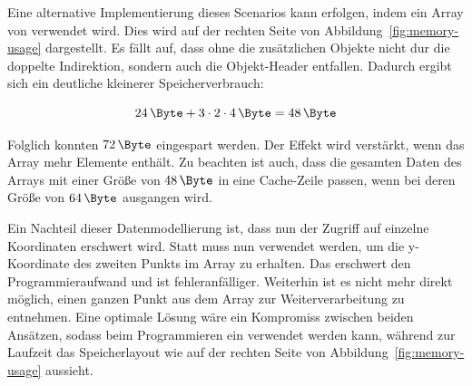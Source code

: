 Eine alternative Implementierung dieses Scenarios kann erfolgen, indem ein Array von  verwendet wird.
Dies wird auf der rechten Seite von Abbildung~\ref{fig:memory-usage} dargestellt.
Es fällt auf, dass ohne die zusätzlichen Objekte nicht dur die doppelte Indirektion, sondern auch die Objekt-Header entfallen.
Dadurch ergibt sich ein deutliche kleinerer Speicherverbrauch:

\begin{equation}
    \SI{24}{\Byte} + 3 \cdot 2 \cdot \SI{4}{\Byte} = \SI{48}{\Byte}\label{eq:memory-usage-flat}
\end{equation}

Folglich konnten $\SI{72}{\Byte}$ eingespart werden.
Der Effekt wird verstärkt, wenn das Array mehr Elemente enthält.
Zu beachten ist auch, dass die gesamten Daten des Arrays mit einer Größe von $\SI{48}{\Byte}$ in eine Cache-Zeile passen, wenn bei deren Größe von $\SI{64}{\Byte}$ ausgangen wird.

Ein Nachteil dieser Datenmodellierung ist, dass nun der Zugriff auf einzelne Koordinaten erschwert wird.
Statt  muss nun  verwendet werden, um die y-Koordinate des zweiten Punkts im Array zu erhalten.
Das erschwert den Programmieraufwand und ist fehleranfälliger.
Weiterhin ist es nicht mehr direkt möglich, einen ganzen Punkt aus dem Array zur Weiterverarbeitung zu entnehmen.
Eine optimale Lösung wäre ein Kompromiss zwischen beiden Ansätzen, sodass beim Programmieren ein  verwendet werden kann, während zur Laufzeit das Speicherlayout wie auf der rechten Seite von Abbildung~\ref{fig:memory-usage} aussieht.

